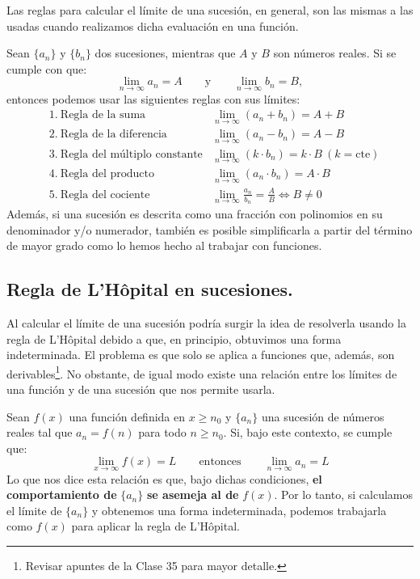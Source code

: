 \documentclass[12pt]{article}
\begin{document}
Las reglas para calcular el límite de una sucesión, en general, son las mismas a las usadas cuando realizamos dicha evaluación en una función.

Sean $\{a_{n}\}$ y $\{b_{n}\}$ dos sucesiones, mientras que $A$ y $B$ son números reales. Si se cumple con que:
\[
  \lim_{n \to \infty} a_{n} = A \qquad \text{y} \qquad \lim_{n \to \infty} b_{n} = B,
\]
entonces podemos usar las siguientes reglas con sus límites:
\begin{align*}
& 1. \ \text{Regla de la suma}               &\lim_{n \to \infty} (a_{n} + b_{n}) = A + B \\
& 2. \ \text{Regla de la diferencia}         &\lim_{n \to \infty} (a_{n} - b_{n}) = A - B \\
& 3. \ \text{Regla del múltiplo constante}   &\lim_{n \to \infty} (k \cdot b_{n}) = k \cdot B \ (k = \text{cte}) \\
& 4. \ \text{Regla del producto}             &\lim_{n \to \infty} (a_{n} \cdot b_{n}) = A \cdot B \\
& 5. \ \text{Regla del cociente}             &\lim_{n \to \infty} \frac{a_{n}}{b_{n}} = \frac{A}{B} \iff B \neq 0
\end{align*}
Además, si una sucesión es descrita como una fracción con polinomios en su denominador y/o numerador, también es posible simplificarla a partir del término de mayor grado como lo hemos hecho al trabajar con funciones.

\subsection{Regla de L'Hôpital en sucesiones.}

Al calcular el límite de una sucesión podría surgir la idea de resolverla usando la regla de L'Hôpital debido a que, en principio, obtuvimos una forma indeterminada. El problema es que solo se aplica a funciones que, además, son derivables\footnote{Revisar apuntes de la Clase 35 para mayor detalle.}. No obstante, de igual modo existe una relación entre los límites de una función y de una sucesión que nos permite usarla.

Sean $f(x)$ una función definida en $x \geq n_{0}$ y $\{a_{n}\}$ una sucesión de números reales tal que $a_{n} = f(n)$ para todo $n \geq n_{0}$. Si, bajo este contexto, se cumple que:
\[
  \lim_{x \to \infty} f(x) = L \qquad \text{entonces} \qquad \lim_{n \to \infty} a_{n} = L
\]
Lo que nos dice esta relación es que, bajo dichas condiciones, \textbf{el comportamiento de} $\{a_{n}\}$ \textbf{se asemeja al de} $f(x)$. Por lo tanto, si calculamos el límite de $\{a_{n}\}$ y obtenemos una forma indeterminada, podemos trabajarla como $f(x)$ para aplicar la regla de L'Hôpital.
\end{document}
